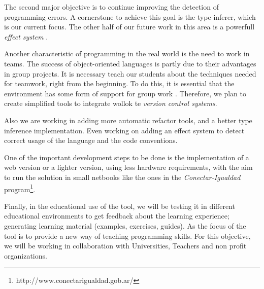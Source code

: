 The second major objective is to continue improving the detection of programming errors.
A cornerstone to achieve this goal is the type inferer, which is our current focus.
The other half of our future work in this area is a powerfull \emph{effect system} \cite{nielson_type_1999}.

Another characteristic of programming in the real world is the need to work in teams. 
The success of object-oriented languages is partly due to their advantages in group projects. 
It is necessary teach our students about the techniques needed for teamwork, right from the beginning. 
To do this, it is essential that the environment has some form of support for group work \cite{kolling_problem_1999}.
Therefore, we plan to create simplified tools to integrate wollok te \emph{version control systems}.

Also we are working in adding more automatic refactor tools, and a better type inference implementation. 
Even working on adding an effect system to detect correct usage of the language and the code conventions.

One of the important development steps to be done is the implementation of a web version or a lighter version, using less hardware requirements, 
with the aim to run the solution in small netbooks like the ones in the \emph{Conectar-Igualdad} program\footnote{http://www.conectarigualdad.gob.ar/}.

Finally, in the educational use of the tool, we will be testing it in different educational environments to get feedback about the learning experience; 
generating learning material (\eg examples, exercises, guides). As the focus of the tool is to provide a new way of teaching programming skills. 
For this objective, we will be working in collaboration with Universities, Teachers and non profit organizations.
